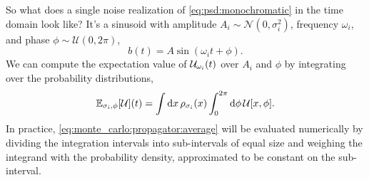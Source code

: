 So what does a single noise realization of \cref{eq:psd:monochromatic} in the time domain look like?
It's a sinusoid with amplitude $A_i \sim \mathcal{N}(0, \sigma_i^2)$, frequency $\omega_i$, and phase $\phi \sim \mathcal{U}(0, 2\pi)$,
\begin{equation}
    b(t) = A\sin(\omega_i t + \phi).
\end{equation}
We can compute the expectation value of $\mathcal{U}_{\omega_i}(t)$ over $A_i$ and $\phi$ by integrating over the probability distributions,
\begin{equation}
    \label{eq:monte_carlo:propagator:average}
    \mathbb{E}_{\sigma_i,\phi}[\mathcal{U}](t) = \int\dd{x}\rho_{\sigma_i}(x)\int_0^{2\pi}\dd{\phi}\mathcal{U}[x, \phi].
\end{equation}
In practice, \cref{eq:monte_carlo:propagator:average} will be evaluated numerically by dividing the integration intervals into sub-intervals of equal size and weighing the integrand with the probability density, approximated to be constant on the sub-interval.
